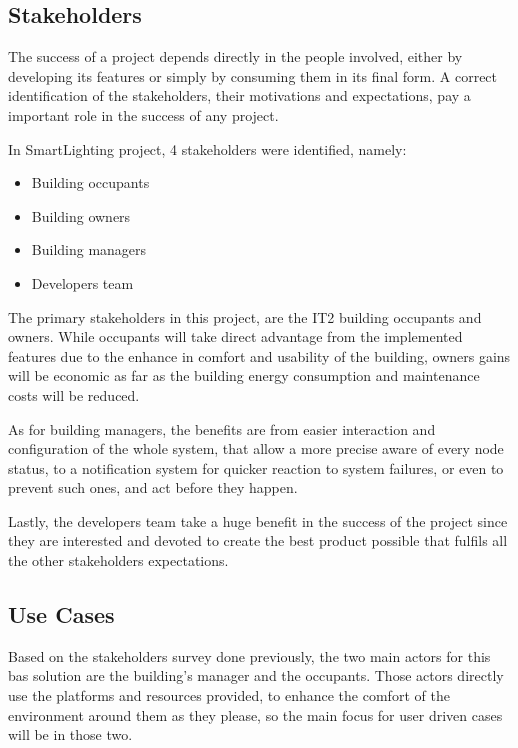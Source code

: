 \subsection{Stakeholders}
\label{Architecture:Stakeholders}

The success of a project depends directly in the people involved, either by developing its features or simply by consuming them in its final form. A correct identification of the stakeholders, their motivations and expectations, pay a important role in the success of any project. 

In SmartLighting project, 4 stakeholders were identified, namely:

\begin{itemize}
	\item Building occupants
	\item Building owners
	\item Building managers
	\item Developers team
\end{itemize}


The primary stakeholders in this project, are the IT2 building occupants and owners. While occupants will take direct advantage from the implemented features due to the enhance in comfort and usability of the building, owners gains will be economic as far as the building energy consumption and maintenance costs will be reduced.

As for building managers, the benefits are from easier interaction and configuration of the whole system, that allow a more precise aware of every node status, to a notification system for quicker reaction to system failures, or even to prevent such ones, and act before they happen.

Lastly, the developers team take a huge benefit in the success of the project since they are interested and devoted to create the best product possible that fulfils all the other stakeholders expectations.


\subsection{Use Cases}
\label{Architecture:SLusecases}

Based on the stakeholders survey done previously, the two main actors for this \ac{bas} solution are the building's manager and the occupants. Those actors directly use the platforms and resources provided, to enhance the comfort of the environment around them as they please, so the main focus for user driven cases will be in those two. 

